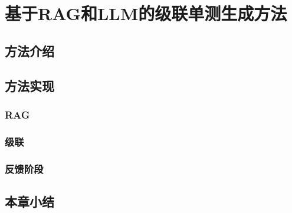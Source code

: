 \chapter{基于RAG和LLM的级联单测生成方法}
    \section{方法介绍}
    \section{方法实现}
        \subsection{RAG}
        \subsection{级联}
        \subsection{反馈阶段}
    \section{本章小结}
